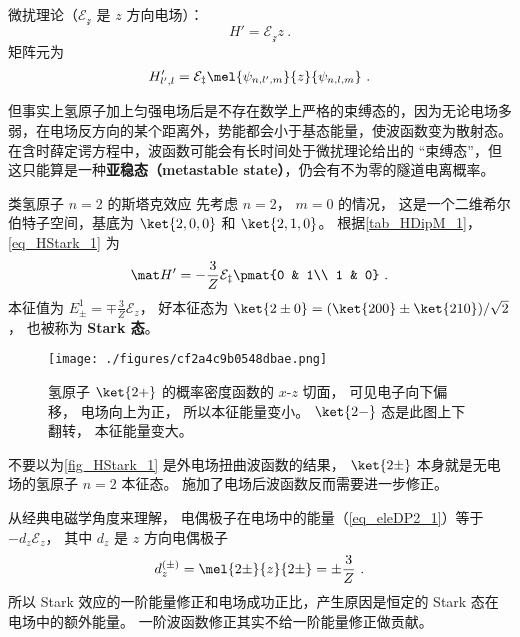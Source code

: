
\begin{issues}
\issueTODO
\end{issues}


微扰理论（$\mathcal{E_z}$ 是 $z$ 方向电场）：
\begin{equation}
H' = \mathcal{E_z} z~.
\end{equation}
矩阵元为
\begin{equation}\label{eq_HStark_1}
H'_{l',l} = \mathcal{E_z}\mel{\psi_{n,l',m}}{z}{\psi_{n,l,m}}~.
\end{equation}

但事实上氢原子加上匀强电场后是不存在数学上严格的束缚态的，因为无论电场多弱，在电场反方向的某个距离外，势能都会小于基态能量，使波函数变为散射态。在含时薛定谔方程中，波函数可能会有长时间处于微扰理论给出的 “束缚态”，但这只能算是一种\textbf{亚稳态（metastable state）}，仍会有不为零的隧道电离概率。

\begin{example}{类氢原子 $n=2$ 的斯塔克效应}
先考虑 $n=2$， $m=0$ 的情况， 这是一个二维希尔伯特子空间，基底为 $\ket{2,0,0}$ 和 $\ket{2,1,0}$。 根据\autoref{tab_HDipM_1}， \autoref{eq_HStark_1} 为
\begin{equation}
\mat H' = -\frac{3}{Z}\mathcal{E_z}\pmat{0 & 1\\ 1 & 0}~.
\end{equation}
本征值为 $E_{\pm}^1 = \mp \frac{3}{Z}\mathcal{E}_z$， 好本征态为 $\ket{2\pm 0} = (\ket{200} \pm \ket{210})/{\sqrt 2}$， 也被称为 \textbf{Stark 态}。

\begin{figure}[ht]
\centering
\texttt{[image: ./figures/cf2a4c9b0548dbae.png]}
\caption{氢原子 $\ket{2+}$ 的概率密度函数的 $x$-$z$ 切面， 可见电子向下偏移， 电场向上为正， 所以本征能量变小。 $\ket{2-}$ 态是此图上下翻转， 本征能量变大。} \label{fig_HStark_1}
\end{figure}

不要以为\autoref{fig_HStark_1} 是外电场扭曲波函数的结果， $\ket{2\pm}$ 本身就是无电场的氢原子 $n=2$ 本征态。 施加了电场后波函数反而需要进一步修正。

从经典电磁学角度来理解， 电偶极子在电场中的能量（\autoref{eq_eleDP2_1}）等于 $-d_z \mathcal{E}_z$， 其中 $d_z$ 是 $z$ 方向电偶极子
\begin{equation}
d_z^{(\pm)} = \mel{2\pm}{z}{2\pm} = \pm \frac{3}{Z}~.
\end{equation}
所以 Stark 效应的一阶能量修正和电场成功正比，产生原因是恒定的 Stark 态在电场中的额外能量。 一阶波函数修正其实不给一阶能量修正做贡献。
\end{example}

